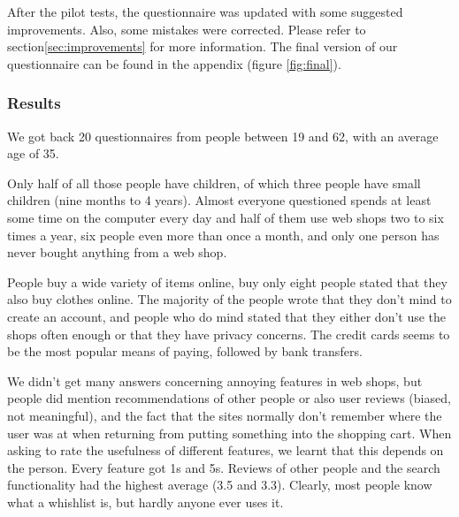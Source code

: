 After the pilot tests, the questionnaire was updated with some suggested improvements. Also, some mistakes were corrected. Please refer to section\ref{sec:improvements} for more information.
The final version of our questionnaire can be found in the appendix (figure \ref{fig:final}).

\subsubsection{Results}
We got back 20 questionnaires from people between 19 and 62, with an average age of 35. 

Only half of all those people have children, of which three people have small children (nine months to 4 years). Almost everyone questioned spends at least some time on the computer every day and half of them use web shops two to six times a year, six people even more than once a month, and only one person has never bought anything from a web shop.

People buy a wide variety of items online, buy only eight people stated that they also buy clothes online. The majority of the people wrote that they don't mind to create an account, and people who do mind stated that they either don't use the shops often enough or that they have privacy concerns.
The credit cards seems to be the most popular means of paying, followed by bank transfers.

We didn't get many answers concerning annoying features in web shops, but people did mention recommendations of other people or also user reviews (biased, not meaningful), and the fact that the sites normally don't remember where the user was at when returning from putting something into the shopping cart. When asking to rate the usefulness of different features, we learnt that this depends on the person. Every feature got 1s and 5s. Reviews of other people and the search functionality had the highest average (3.5 and 3.3). Clearly, most people know what a whishlist is, but hardly anyone ever uses it.

